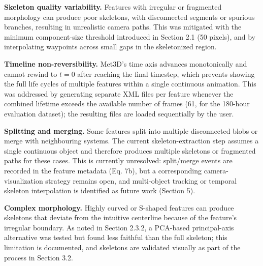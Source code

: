 \documentclass[journal abbreviation, manuscript]{copernicus}
\begin{document}
\textbf{Skeleton quality variability.} Features with irregular or fragmented morphology can produce poor skeletons, with disconnected segments or spurious branches, resulting in unrealistic camera paths. This was mitigated with the minimum component-size threshold introduced in Section 2.1 (50 pixels), and by interpolating waypoints across small gaps in the skeletonized region.

\textbf{Timeline non-reversibility.} Met3D's time axis advances monotonically and cannot rewind to $t=0$ after reaching the final timestep, which prevents showing the full life cycles of multiple features within a single continuous animation. This was addressed by generating separate XML files per feature whenever the combined lifetime exceeds the available number of frames (61, for the 180-hour evaluation dataset); the resulting files are loaded sequentially by the user.

\textbf{Splitting and merging.} Some features split into multiple disconnected blobs or merge with neighbouring systems. The current skeleton-extraction step assumes a single continuous object and therefore produces multiple skeletons or fragmented paths for these cases. This is currently unresolved: split/merge events are recorded in the feature metadata (Eq. 7b), but a corresponding camera-visualization strategy remains open, and multi-object tracking or temporal skeleton interpolation is identified as future work (Section 5).

\textbf{Complex morphology.} Highly curved or S-shaped features can produce skeletons that deviate from the intuitive centerline because of the feature's irregular boundary. As noted in Section 2.3.2, a PCA-based principal-axis alternative was tested but found less faithful than the full skeleton; this limitation is documented, and skeletons are validated visually as part of the process in Section 3.2.
\end{document}
